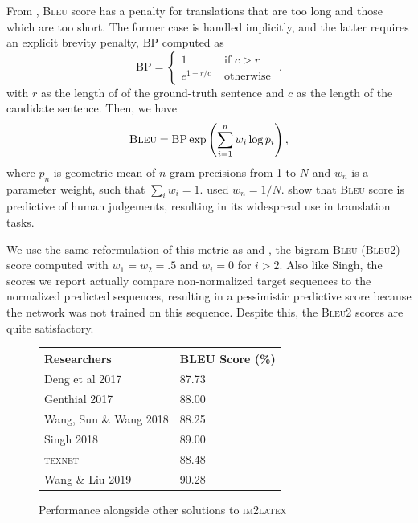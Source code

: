 \documentclass[12pt]{article}
\newcommand{\BLEU}{\textsc{Bleu}}
\begin{document}
From \citeauthor{papineni2002bleu}, \BLEU{} score has a penalty for translations
that are too long and those which are too short. The former case is handled
implicitly, and the latter requires an explicit brevity penalty, $\text{BP}$
computed as
\begin{equation}
 \text{BP} = \begin{cases}1 &\text{ if } c>r \\
  e^{1-r/c} &\text{ otherwise }\end{cases}.
\end{equation}
with $r$ as the length of of the ground-truth sentence and $c$ as the length of
the candidate sentence. Then, we have 
\begin{equation}
  \text{\BLEU} = \text{BP} \exp\left( \sum_{i=1}^n w_i \log p_i \right),
\end{equation}
where $p_n$ is geometric mean of $n$-gram precisions from 1 to $N$ and $w_n$ is
a parameter weight, such that $\sum_i w_i = 1$. \citeauthor{papineni2002bleu}
used $w_n = 1/N$. \citeauthor{papineni2002bleu} show that \BLEU{} score is
predictive of human judgements, resulting in its widespread use in translation
tasks.

We use the same reformulation of this metric as \parencite{singh2018teaching}
and \parencite{deng2016you}, the bigram \BLEU{} (\BLEU{}2) score computed with
$w_1=w_2=.5$ and $w_i = 0$ for $i>2$. Also like Singh, the scores we report
actually compare non-normalized target sequences to the normalized predicted
sequences, resulting in a pessimistic predictive score because the network was
not trained on this sequence. Despite this, the \BLEU{}2 scores are quite
satisfactory.

\begin{figure}[!ht]
  
\begin{longtable}[]{@{}ll@{}}
\toprule
Researchers & BLEU Score (\%) \tabularnewline
\midrule
\endhead
Deng et al 2017 & 87.73 \tabularnewline
Genthial 2017 & 88.00 \tabularnewline
Wang, Sun \& Wang 2018 & 88.25 \tabularnewline
Singh 2018 & 89.00 \tabularnewline
\textsc{texnet} & 88.48 \tabularnewline
Wang \& Liu 2019 & 90.28 \tabularnewline
\bottomrule
\end{longtable}\caption{Performance alongside other solutions to \textsc{im2latex}}
\end{figure}
\end{document}
